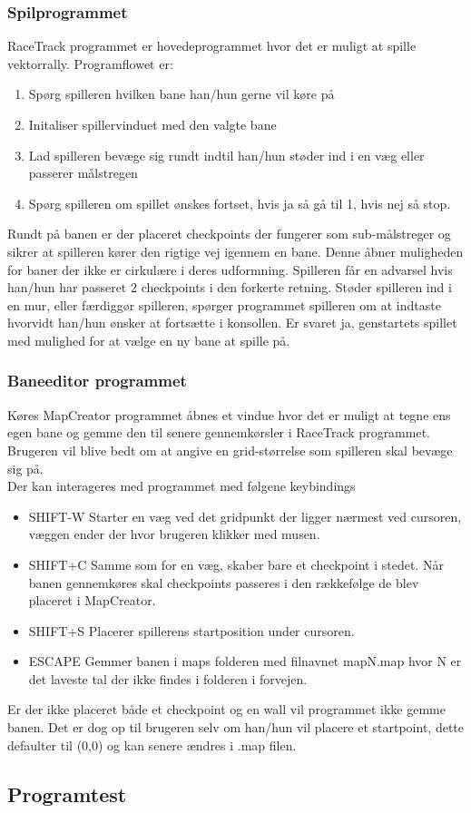 \subsubsection{Spilprogrammet}
RaceTrack programmet er hovedeprogrammet hvor det er muligt at spille vektorrally. Programflowet er:
\begin{enumerate}
\item Spørg spilleren hvilken bane han/hun gerne vil køre på
\item Initaliser spillervinduet med den valgte bane 
\item Lad spilleren bevæge sig rundt indtil han/hun støder ind i en væg eller passerer målstregen
\item Spørg spilleren om spillet ønskes fortset, hvis ja så gå til 1, hvis nej så stop.
\end{enumerate}
Rundt på banen er der placeret checkpoints der fungerer som sub-målstreger og sikrer at spilleren kører den rigtige vej igennem en bane. Denne åbner muligheden for baner der ikke er cirkulære i deres udformning. Spilleren får en advarsel hvis han/hun har passeret 2 checkpoints i den forkerte retning.
Støder spilleren ind i en mur, eller færdiggør spilleren, spørger programmet spilleren om at indtaste hvorvidt han/hun ønsker at fortsætte i konsollen. Er svaret ja, genstartets spillet med mulighed for at vælge en ny bane at spille på.

\subsubsection{Baneeditor programmet}
Køres MapCreator programmet åbnes et vindue hvor det er muligt at tegne ens egen bane og gemme den til senere gennemkørsler i RaceTrack programmet. Brugeren vil blive bedt om at angive en grid-størrelse som spilleren skal bevæge sig på. \\
Der kan interageres med programmet med følgene keybindings
\begin{itemize}
\item SHIFT-W Starter en væg ved det gridpunkt der ligger nærmest ved cursoren, væggen ender der hvor brugeren klikker med musen.
\item SHIFT+C Samme som for en væg, skaber bare et checkpoint i stedet. Når banen gennemkøres skal checkpoints passeres i den rækkefølge de blev placeret i MapCreator.
\item SHIFT+S Placerer spillerens startposition under cursoren.
\item ESCAPE Gemmer banen i maps folderen med filnavnet mapN.map hvor N er det laveste tal der ikke findes i folderen i forvejen.
\end{itemize}
Er der ikke placeret både et checkpoint og en wall vil programmet ikke gemme banen. Det er dog op til brugeren selv om han/hun vil placere et startpoint, dette defaulter til (0,0) og kan senere ændres i .map filen.

\subsection{Programtest}

